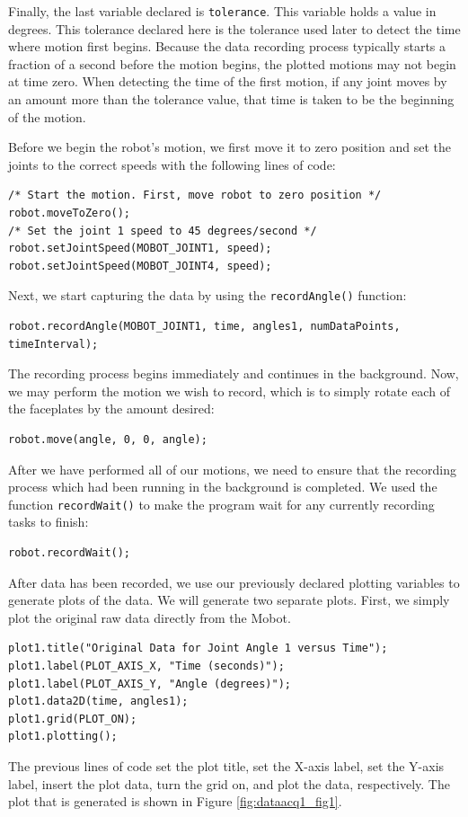 \documentclass{article}
\begin{document}
Finally, the last variable declared is \texttt{tolerance}. This variable 
holds a value in degrees. This tolerance declared here is the tolerance used
later to detect the time where motion first begins. Because the data recording 
process typically starts a fraction of a second before the motion begins, the
plotted motions may not begin at time zero. When detecting the time of the
first motion, if any joint moves by an amount more than the tolerance value, 
that time is taken to be the beginning of the motion.

Before we begin the robot's motion, we first move it to zero position and set the
joints to the correct speeds with the following lines of code:
\begin{verbatim}
/* Start the motion. First, move robot to zero position */
robot.moveToZero();
/* Set the joint 1 speed to 45 degrees/second */
robot.setJointSpeed(MOBOT_JOINT1, speed);
robot.setJointSpeed(MOBOT_JOINT4, speed);
\end{verbatim}

Next, we start capturing the data by using the \texttt{recordAngle()} function:
\begin{verbatim}
robot.recordAngle(MOBOT_JOINT1, time, angles1, numDataPoints, timeInterval);
\end{verbatim}

The recording process begins immediately and continues in the background. Now,
we may perform the motion we wish to record, which is to simply rotate each of
the faceplates by the amount desired:
\begin{verbatim}
robot.move(angle, 0, 0, angle);
\end{verbatim}

After we have performed all of our motions, we need to ensure that the recording
process which had been running in the background is completed. We used the function
\texttt{recordWait()} to make the program wait for any currently recording tasks
to finish:
\begin{verbatim}
robot.recordWait();
\end{verbatim}

After data has been recorded, we use our previously declared plotting variables to 
generate plots of the data. We will generate two separate plots. First, we simply
plot the original raw data directly from the Mobot.
\begin{verbatim}
plot1.title("Original Data for Joint Angle 1 versus Time");
plot1.label(PLOT_AXIS_X, "Time (seconds)");
plot1.label(PLOT_AXIS_Y, "Angle (degrees)");
plot1.data2D(time, angles1);
plot1.grid(PLOT_ON);
plot1.plotting();
\end{verbatim}
The previous lines of code set the plot title, set the X-axis label, set the Y-axis label,
insert the plot data, turn the grid on, and plot the data, respectively. The plot
that is generated is shown in Figure \ref{fig:dataacq1_fig1}. 
\end{document}
